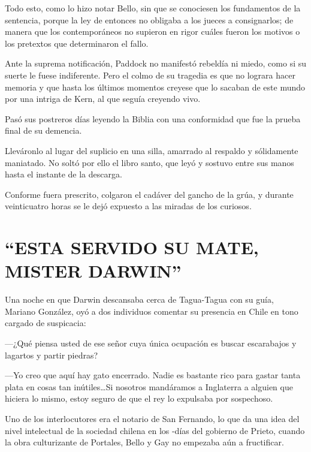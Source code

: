 \documentclass[10pt,twoside,openright]{memoir}
\begin{document}
Todo esto, como lo hizo notar Bello, sin que se conociesen los
fundamentos de la sentencia, porque la ley de entonces no obligaba a los
jueces a consignarlos; de manera que los contemporáneos no supieron en
rigor cuáles fueron los motivos o los pretextos que determinaron el
fallo.

Ante la suprema notificación, Paddock no manifestó rebeldía ni miedo,
como si su suerte le fuese indiferente. Pero el colmo de su tragedia es
que no lograra hacer memoria y que hasta los últimos momentos creyese
que lo sacaban de este mundo por una intriga de Kern, al que seguía
creyendo vivo.

Pasó sus postreros días leyendo la
Biblia con una conformidad que fue la prueba final de su demencia.

Lleváronlo al lugar del suplicio en una silla, amarrado al respaldo y
sólidamente maniatado. No soltó por ello el libro santo, que leyó y
sostuvo entre sus manos hasta el instante de la descarga.

Conforme fuera prescrito, colgaron el cadáver del gancho de la grúa, y
durante veinticuatro horas se le dejó expuesto a las miradas de los
curiosos.

\chapter{``ESTA SERVIDO SU MATE, MISTER DARWIN''}

Una noche en que Darwin descansaba cerca de Tagua-Tagua con su guía,
Mariano González, oyó a dos individuos comentar su presencia en Chile en
tono cargado de suspicacia:

---¿Qué piensa usted de ese señor cuya única ocupación es buscar
escarabajos y lagartos y partir piedras?

---Yo creo que aquí hay gato
encerrado. Nadie es bastante rico para gastar tanta plata en cosas tan
inútiles\ldots Si nosotros mandáramos a Inglaterra a alguien que hiciera lo
mismo, estoy seguro de que el rey lo expulsaba por sospechoso.

Uno de los interlocutores era el notario de San Fernando, lo que da una
idea del nivel intelectual de la sociedad chilena en los -días del
gobierno de Prieto, cuando la obra culturizante de Portales, Bello y Gay
no empezaba aún a fructificar.
\end{document}
